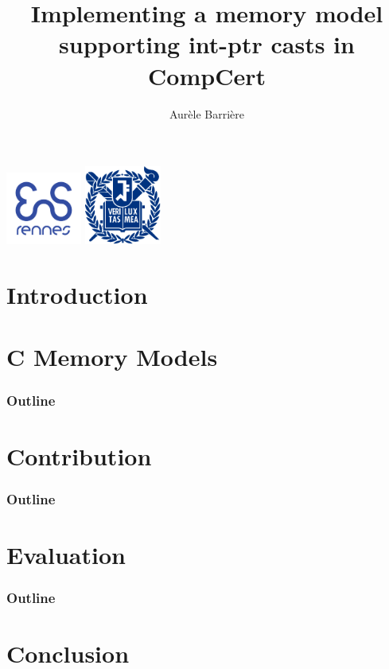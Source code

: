 \documentclass[page number]{beamer}
\begin{document}
\title[Int-Ptr casts in CompCert]{Implementing a memory model supporting int-ptr casts in CompCert}


\author{Aur\`ele Barri\`ere}

\def\todo#1{{\color{red}TODO:\quad#1}}
\def\addref#1{{\color{red}$[$#1$]$}}
\def\undef{\textit{undef}}
\def\states#1{\mathit{States_{#1}}}
\def\step#1{\mathit{Step_{#1}}}
\def\atstep#1{\mathit{AtomicStep_{#1}}}
\def\traces{\mathit{Traces}}
\def\comment#1{{\color{blue}\textit{#1}}}
\def\outline{
  \begin{frame}
    \frametitle{Outline}
    \tableofcontents[currentsection]
  \end{frame}
}



\begin{frame}[plain]
  \titlepage%
  \vfill
  \begin{center}
    \includegraphics[width=2.5cm]{img/enslogo.png}
    \hfill
    \includegraphics[width=2.5cm]{img/snulogo.png}
  \end{center}
\end{frame}

\section{Introduction}


\section{C Memory Models}
\outline



\section{Contribution}
\outline


\section{Evaluation}
\outline


\section{Conclusion}

\end{document}
